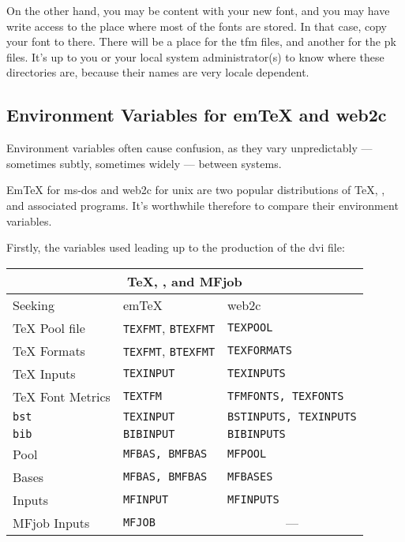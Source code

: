 On the other hand, you may be content with your new font, and you may
have write access to the place where most of the fonts are stored.  In
that case, copy your font to there.  There will be a place for the
{\sc tfm} files, and another for the {\sc pk} files.  It's up to you
or your local system administrator(s) to know where these directories
are, because their names are very locale dependent.


\subsection{Environment Variables for em\TeX{} and {\sf web2c}}%
\label{sub:env}

Environment variables often cause confusion, as they vary unpredictably
--- sometimes subtly, sometimes widely --- between systems.

Em\TeX{} for {\sc ms-dos} and {\sf web2c} for {\sc unix} are two
popular distributions of \TeX{}, \MF{}, and associated programs.
It's worthwhile therefore to compare their environment variables.

Firstly, the variables used leading up to the production of the
{\sc dvi} file:

\begin{center}
\begin{tabular}{|l|l|l|}
  \hline
  \multicolumn{3}{|c|}{\TeX{}, \BibTeX{}, \MF{} and {\sf MFjob}} \\
  \hline
  Seeking & em\TeX{} & {\sf web2c} \\
  \hline
  \TeX{} Pool file & {\tt TEXFMT}, {\tt BTEXFMT} & {\tt TEXPOOL} \\
  \TeX{} Formats & {\tt TEXFMT}, {\tt BTEXFMT} & {\tt TEXFORMATS} \\
  \TeX{} Inputs & {\tt TEXINPUT} & {\tt TEXINPUTS} \\
  \TeX{} Font Metrics & {\tt TEXTFM} & {\tt TFMFONTS, TEXFONTS} \\
  \hline
  \BibTeX{} {\tt bst} & {\tt TEXINPUT} & {\tt BSTINPUTS, TEXINPUTS} \\
  \BibTeX{} {\tt bib} & {\tt BIBINPUT} & {\tt BIBINPUTS} \\
  \hline
  \MF{} Pool & {\tt MFBAS, BMFBAS} & {\tt MFPOOL} \\
  \MF{} Bases & {\tt MFBAS, BMFBAS} & {\tt MFBASES} \\
  \MF{} Inputs & {\tt MFINPUT} & {\tt MFINPUTS} \\
  {\sf MFjob} Inputs & {\tt MFJOB} & \multicolumn{1}{c|}{---} \\
  \hline
\end{tabular}
\end{center}

